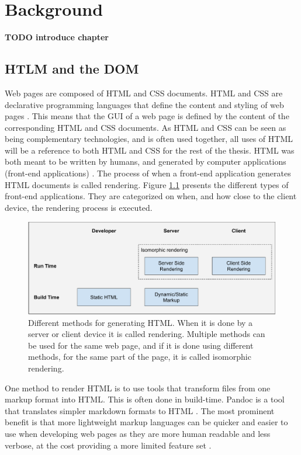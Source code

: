 \chapter{Background}

\textbf{TODO introduce chapter}

\section{HTLM and the DOM}

Web pages are composed of \ac{HTML} and \ac{CSS} documents. \ac{HTML} and \ac{CSS} are declarative programming languages that define the content and styling of web pages \cite{Lie1999}. This means that the \ac{GUI} of a web page is defined by the content of the corresponding \ac{HTML} and \ac{CSS} documents. As \ac{HTML} and \ac{CSS} can be seen as being complementary technologies, and is often used together, all uses of \ac{HTML} will be a reference to both \ac{HTML} and \ac{CSS} for the rest of the thesis. \ac{HTML} was both meant to be written by humans, and generated by computer applications (front-end applications) \cite{Lie1999}. The process of when a front-end application generates \ac{HTML} documents is called rendering. Figure \ref{fig:fe-render-methods} presents the different types of front-end applications. They are categorized on when, and how close to the client device, the rendering process is executed.

\begin{figure}
    \centering
    \includegraphics[width=\linewidth]{images/fe-rendering.pdf}
    \caption{Different methods for generating \ac{HTML}. When it is done by a server or client device it is called rendering. Multiple methods can be used for the same web page, and if it is done using different methods, for the same part of the page, it is called isomorphic rendering.}
    \label{fig:fe-render-methods}
\end{figure}

One method to render HTML is to use tools that transform files from one markup format into \ac{HTML}. This is often done in build-time. Pandoc is a tool that translates simpler markdown formats to \ac{HTML} \cite{Dominici2014}. The most prominent benefit is that more lightweight markup languages can be quicker and easier to use when developing web pages as they are more human readable and less verbose, at the cost providing a more limited feature set \cite{Dominici2014}.

